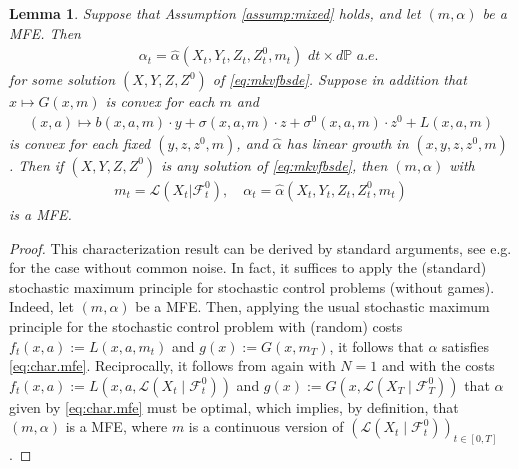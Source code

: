 \documentclass[11pt,reqno]{amsart}
\numberwithin{equation}{section}
\newtheorem{lemma}[theorem]{Lemma}
\theoremstyle{definition}
\newcommand{\sL}{\mathcal{L}}
\newcommand{\bP}{\mathbb{P}}
\newcommand{\sF}{\mathcal{F}}
\newcommand\cF{\mathcal F}
\newcommand\cL{\mathcal L}
\begin{document}
\begin{lemma} \label{lem:mpmfggen}
  Suppose that Assumption \ref{assump:mixed} holds, and let $(m,\alpha)$ be a MFE. Then
  \begin{align}
  \label{eq:char.mfe}
   \alpha_t = \widehat{\alpha}(X_t,Y_t,Z_t,Z_t^0,m_t) \,\, dt \times d\bP \,\, a.e. \,\,
   \end{align}
   for some solution $(X, Y, Z,Z^0)$ of \eqref{eq:mkvfbsde}.
   Suppose in addition that $x \mapsto G(x,m)$ is convex for each $m$ and
   \begin{align*}
   (x,a) \mapsto b(x,a,m) \cdot y + \sigma(x,a,m) \cdot z + \sigma^0(x,a,m) \cdot z^0 + L(x,a,m)
   \end{align*}
   is convex for each fixed $(y,z,z^0,m)$, and
   $\hat{\alpha}$ has linear growth in $(x,y,z,z^0,m)$. Then if $(X, Y, Z,Z^0)$ is any solution of \eqref{eq:mkvfbsde}, then $(m,\alpha)$ with
\begin{align*}
m_t = \sL(X_t | \sF_t^0), \quad \alpha_t = \widehat \alpha(X_t,Y_t,Z_t,Z_t^0,m_t)
\end{align*}
 is a MFE.
\end{lemma}
\begin{proof}
  This characterization result can be derived by standard arguments, see e.g. \cite[Theorem 3.27]{cardelbook1} for the case without common noise.
  In fact, it suffices to apply the (standard) stochastic maximum principle for stochastic control problems (without games). Indeed, let $(m,\alpha)$ be a MFE.
  Then, applying the usual stochastic maximum principle for the stochastic control problem with (random) costs $f_t(x,a) := L(x, a,m_t)$ and $g(x) := G(x,m_T)$, it follows that $\alpha$ satisfies \eqref{eq:char.mfe}.
  Reciprocally, it follows from \cite[Theorem 2.16]{cardelbook1} again with $N=1$ and with the costs $f_t(x,a) := L(x, a, \cL(X_t\mid \cF^0_t))$ and $g(x) := G(x, \cL(X_T\mid \cF^0_T))$ 
  that $\alpha$ given by  \eqref{eq:char.mfe} must be optimal, which implies, by definition, that $(m,\alpha)$ is a MFE, where $m$ is a continuous version of $(\cL( X_t\mid \cF^0_t))_{t\in [0,T]}$.
\end{proof}
\end{document}
